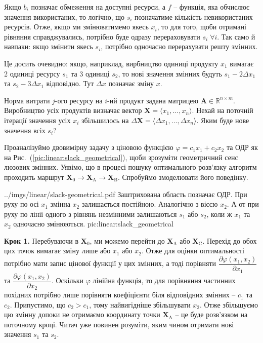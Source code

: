 \documentclass[\main/book.tex]{subfiles}
\begin{document}
Якщо $b_i$ позначає обмеження на доступні ресурси, а $f$ -- функція, яка обчислює значення використаних, то логічно, що $s_i$ позначатиме кількість невикористаних ресурсів. Отже, якщо ми змінюватимемо якесь $x_i$, то для того, щоби отримані рівняння справджувались, потрібно буде одразу перераховувати ${s_i \; \forall i}$. Так само й навпаки: якщо змінити якесь $s_i$, потрібно одночасно перерахувати решту змінних.

\begin{note}
 Це досить очевидно: якщо, наприклад, вирбництво одиниці продукту $x_1$ вимагає 2 одиниці ресурсу $s_1$ та 3 одиниці $s_2$, то нові значення змінних будуть $s_1 - 2 \Delta x_1$ та $s_2 - 3 \Delta x_1$ відповідно. Тут $\Delta x$ позначає зміну $x$.
\end{note}

\begin{question}
 Норма витрати $j$-ого ресурсу на $i$-ий продукт задана матрицею ${\mathbf{A} \in \mathbb{R}^{n \times m}}$. Виробництво усіх продуктів визначає вектор $\mathbf{X} = \langle x_1, \ldots, x_n \rangle$. Нехай на поточній ітерації значення усіх $x_i$ збільшилось на $\Delta \mathbf{X} = \langle \Delta x_1, \ldots, \Delta x_n \rangle$. Яким буде нове значення всіх $s_i$?
\end{question}

Проаналізуймо двовимірну задачу з ціновою функцією $\varphi = c_1 x_1 + c_2 x_2$ та ОДР як на Рис.~(\ref{pic:linear:slack_geometrical}), щоби зрозуміти геометричний сенс люзових змінних. Уявімо, що в процесі пошуку оптимального розв'язку алгоритм проходить маршрут $\mathbf{X}_0 \rightarrow \mathbf{X}_\mathrm{A} \rightarrow \mathbf{X}_\mathrm{B}$. Спробуймо змоделювати його поведінку.

\illustration
 {../imgs/linear/slack-geometrical.pdf}
 {Заштрихована область позначає ОДР. При руху по осі $x_1$ змінна $x_2$ залишається постійною. Аналогічно з віссю $x_2$. А от при руху по лінії одного з рівнянь незмінними залишаються $s_1$ або $s_2$, коли ж $x_1$ та $x_2$ одночасно змінюються.}
 {pic:linear:slack_geometrical}

\textbf{Крок 1.} \quad Перебуваючи в $\mathbf{X}_0$, ми можемо перейти до $\mathbf{X}_\mathrm{A}$ або $\mathbf{X}_\mathrm{C}$. Перехід до обох цих точок вимагає зміну лише або $x_1$ або $x_2$. Отже для оцінки оптимальності потрібно мати запис цінової функції у цих змінних, а тоді порівняти $\dfrac{\partial \varphi(x_1, x_2)}{\partial x_1}$ та $\dfrac{\partial \varphi(x_1, x_2)}{\partial x_2}$. Оскільки $\varphi$ лінійна функція, то для порівняння частинних похідних потрібно лише порівняти коефіцієнти біля відповідних змінних -- $c_1$ та $c_2$. Припустимо, що $c_2 > c_1$, тому найвигідніше збільшувати $x_2$. Отже збільшуємо цю змінну допоки не отримаємо координату точки $\mathbf{X}_\mathrm{A}$ -- це буде розв'язком на поточному кроці. Читач уже повинен розуміти, яким чином отримати нові значення $s_1$ та $s_2$.
\end{document}
